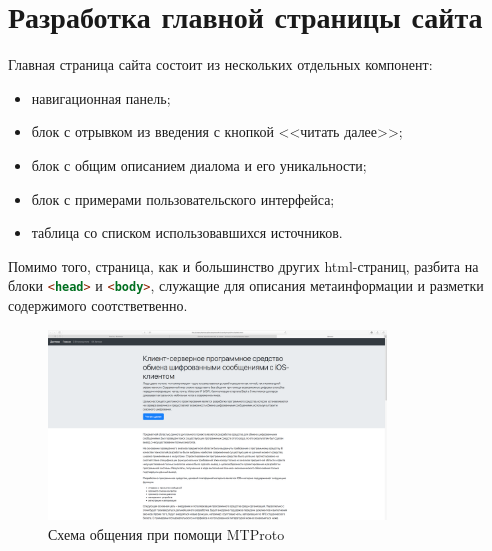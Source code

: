 \section{Разработка главной страницы сайта}
\label{sec:practice}

Главная страница сайта состоит из нескольких отдельных компонент:
\begin{itemize}
	\item навигационная панель;
	\item блок с отрывком из введения с кнопкой <<читать далее>>;
	\item блок с общим описанием диалома и его уникальности;
	\item блок с примерами пользовательского интерфейса;
	\item таблица со списком использовавшихся источников.
\end{itemize}

Помимо того, страница, как и большинство других \gls{html}-страниц, разбита на блоки \lstinline[language=HTML]{<head>} и \lstinline[language=HTML]{<body>}, служащие для описания метаинформации и разметки содержимого соотстветвенно.

\begin{figure}[h]
  \centering
    \includegraphics[width=0.8\textwidth]{inc/img/title}
  \caption{Схема общения при помощи MTProto}
  \label{sec:analysis:research:analogs:telegram:mtproto1}
\end{figure}